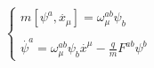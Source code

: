 \begin{equation}
\left\{ 
\begin{array}{c}
m\left[ \psi ^{a},\stackrel{.}{x}_{\mu }\right] =\omega _{\mu }^{ab}\psi _{b}
\\ 
\\ 
\stackrel{.}{\psi }^{a}=\omega _{\mu }^{ab}\psi _{b}\stackrel{.}{x}^{\mu }-%
\frac{q}{m}F^{ab}\psi ^{b}
\end{array}
\right.
\end{equation}

